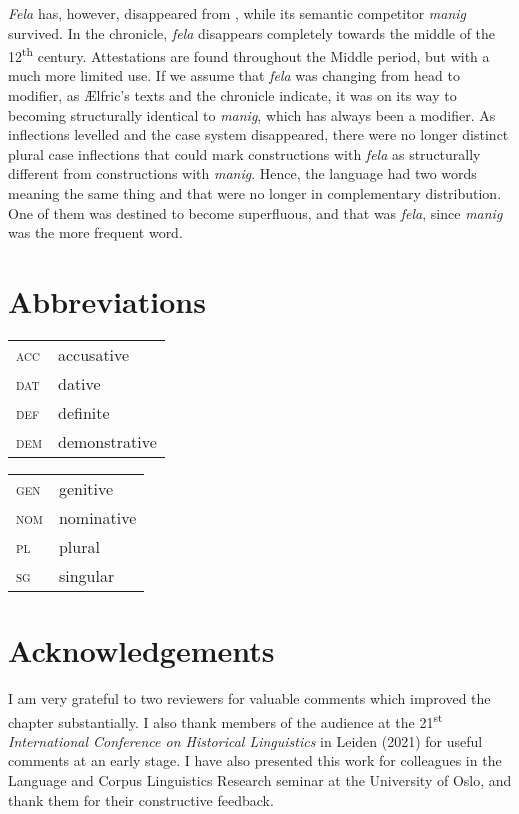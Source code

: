 \documentclass[output=paper,colorlinks,citecolor=brown]{langscibook}
\begin{document}
\textit{Fela} has, however, disappeared from , while its semantic competitor \textit{manig} survived. In the chronicle, \textit{fela} disappears completely towards the middle of the 12\textsuperscript{th} century. Attestations are found throughout the Middle  period, but with a much more limited use. If we assume that \textit{fela} was changing from head to modifier, as Ælfric’s texts and the chronicle indicate, it was on its way to becoming structurally identical to \textit{manig}, which has always been a modifier. As inflections levelled and the case system disappeared, there were no longer distinct  plural case inflections that could mark constructions with \textit{fela} as structurally different from constructions with \textit{manig}. Hence, the language had two words meaning the same thing and that were no longer in complementary distribution. One of them was destined to become superfluous, and that was \textit{fela}, since \textit{manig} was the more frequent word. 

\section*{Abbreviations}
\begin{tabularx}{.5\textwidth}{@{}lQ}
\textsc{acc} & accusative\\
\textsc{dat} &  {dative}\\
\textsc{def} & definite\\
\textsc{dem} &  {demonstrative}\\
\end{tabularx}%
\begin{tabularx}{.5\textwidth}{lQ@{}}
\textsc{gen} &  {genitive}\\
\textsc{nom} &  {nominative}\\
\textsc{pl} & plural\\
\textsc{sg} & singular\\
\end{tabularx}


\section*{Acknowledgements}
I am very grateful to two reviewers for valuable comments which improved the chapter substantially. I also thank members of the audience at the 21\textsuperscript{st} \textit{International Conference on  Historical Linguistics} in Leiden (2021) for useful comments at an early stage. I have also presented this work for colleagues in the  Language and Corpus Linguistics Research seminar at the University of Oslo, and thank them for their constructive feedback.  



{\sloppy\printbibliography[heading=subbibliography,notkeyword=this]}
\end{document}
